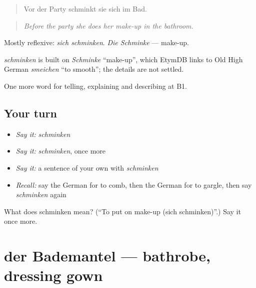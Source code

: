 \begin{quote}
Vor der Party schminkt sie sich im Bad.
\end{quote}

\begin{quote}
\emph{Before the party she does her make-up in the bathroom.}
\end{quote}

Mostly reflexive: \emph{sich schminken}. \emph{Die Schminke} — make-up.

\begin{cousinweb}
\emph{schminken} is built on \emph{Schminke} \textquotedblleft{}make-up\textquotedblright{}, which EtymDB links to Old High German \emph{smeichen} \textquotedblleft{}to smooth\textquotedblright{}; the details are not settled.
\end{cousinweb}

\begin{grammarlens}[title={What you've built}]
One more word for telling, explaining and describing at B1.
\end{grammarlens}

\subsection*{Your turn}
\begin{itemize}
\raggedright
  \item \emph{Say it:} \emph{schminken}
  \item \emph{Say it:} \emph{schminken}, once more
  \item \emph{Say it:} a sentence of your own with \emph{schminken}
  \item \emph{Recall:} say the German for to comb, then the German for to gargle, then say \emph{schminken} again
\end{itemize}

\begin{tcolorbox}[breakable,colback=teal!4,colframe=teal!35!black,title={Before you move on}]
What does schminken mean? (\textquotedblleft{}To put on make-up (sich schminken)\textquotedblright{}.) Say it once more.
\end{tcolorbox}
\section[der Bademantel]{der Bademantel — bathrobe, dressing gown}

\label{lesson:GE-C530-bademantel}



